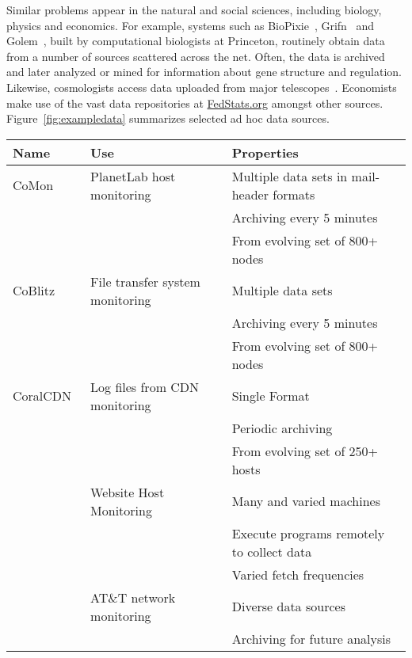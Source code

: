 Similar problems appear in the natural and social sciences,
including biology, physics and economics.  For example, systems such
as BioPixie~\cite{biopixie}, Grifn~\cite{grifn} and
Golem~\cite{golem}, built by computational biologists at Princeton,
routinely obtain data from a number of sources scattered
across the net.  Often, the data is archived and later analyzed or
mined for information about gene structure and regulation.
Likewise, cosmologists access data uploaded from major
telescopes~\cite{sdss}. Economists make use of the vast data
repositories at \url{FedStats.org} amongst other sources.  
Figure~\ref{fig:exampledata} summarizes 
selected ad hoc data sources.


\begin{figure*}
\begin{center}
\begin{tabular}{|l|l|l|}
\hline\hline
Name & Use & Properties 
\\\hline\hline
CoMon~\cite{comon} & PlanetLab host monitoring & Multiple data sets in mail-header formats\\
                                       && Archiving every 5 minutes \\
                                       && From evolving set of 800+ nodes \\\hline
CoBlitz~\cite{coblitz} & File transfer system monitoring & Multiple data sets \\
                                       && Archiving every 5 minutes \\
                                       && From evolving set of 800+ nodes \\\hline
CoralCDN~\cite{coral} & Log files from CDN monitoring & Single Format \\
                                       && Periodic archiving \\
                                       && From evolving set of 250+ hosts \\\hline
\vizGems{}       & Website Host Monitoring & Many and varied machines \\
                 &                         & Execute programs remotely to collect data\\
                 &                         & Varied fetch frequencies \\\hline
\darkstar{}      & AT\&T network monitoring & Diverse data sources\\
                                           && Archiving for future analysis \\

\end{tabular}
\end{center}
\end{figure*}
